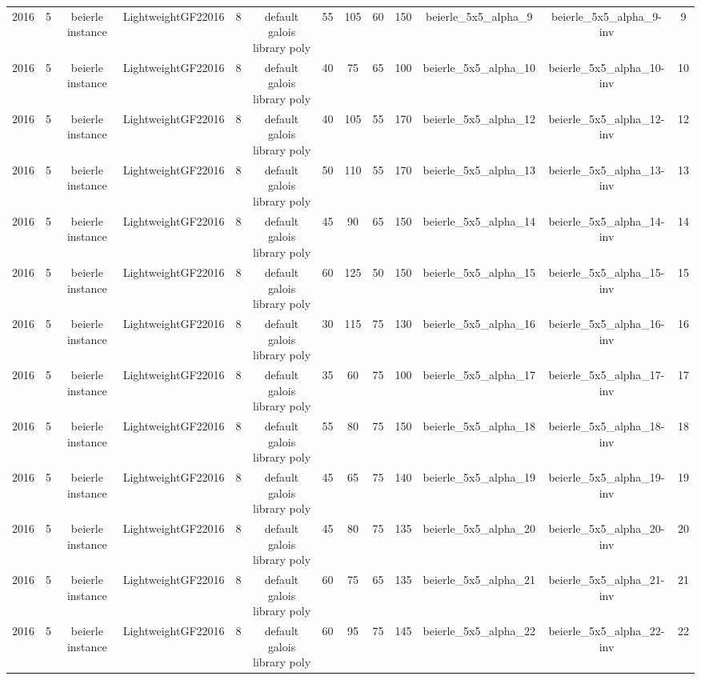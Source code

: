 \begin{tabular}{c c c c c c c c c c c c c}
2016 & 5 & beierle instance & LightweightGF22016 & 8 & default galois library poly & 55 & 105 & 60 & 150 & beierle_5x5_alpha_9 & beierle_5x5_alpha_9-inv & 9 \\
2016 & 5 & beierle instance & LightweightGF22016 & 8 & default galois library poly & 40 & 75 & 65 & 100 & beierle_5x5_alpha_10 & beierle_5x5_alpha_10-inv & 10 \\
2016 & 5 & beierle instance & LightweightGF22016 & 8 & default galois library poly & 40 & 105 & 55 & 170 & beierle_5x5_alpha_12 & beierle_5x5_alpha_12-inv & 12 \\
2016 & 5 & beierle instance & LightweightGF22016 & 8 & default galois library poly & 50 & 110 & 55 & 170 & beierle_5x5_alpha_13 & beierle_5x5_alpha_13-inv & 13 \\
2016 & 5 & beierle instance & LightweightGF22016 & 8 & default galois library poly & 45 & 90 & 65 & 150 & beierle_5x5_alpha_14 & beierle_5x5_alpha_14-inv & 14 \\
2016 & 5 & beierle instance & LightweightGF22016 & 8 & default galois library poly & 60 & 125 & 50 & 150 & beierle_5x5_alpha_15 & beierle_5x5_alpha_15-inv & 15 \\
2016 & 5 & beierle instance & LightweightGF22016 & 8 & default galois library poly & 30 & 115 & 75 & 130 & beierle_5x5_alpha_16 & beierle_5x5_alpha_16-inv & 16 \\
2016 & 5 & beierle instance & LightweightGF22016 & 8 & default galois library poly & 35 & 60 & 75 & 100 & beierle_5x5_alpha_17 & beierle_5x5_alpha_17-inv & 17 \\
2016 & 5 & beierle instance & LightweightGF22016 & 8 & default galois library poly & 55 & 80 & 75 & 150 & beierle_5x5_alpha_18 & beierle_5x5_alpha_18-inv & 18 \\
2016 & 5 & beierle instance & LightweightGF22016 & 8 & default galois library poly & 45 & 65 & 75 & 140 & beierle_5x5_alpha_19 & beierle_5x5_alpha_19-inv & 19 \\
2016 & 5 & beierle instance & LightweightGF22016 & 8 & default galois library poly & 45 & 80 & 75 & 135 & beierle_5x5_alpha_20 & beierle_5x5_alpha_20-inv & 20 \\
2016 & 5 & beierle instance & LightweightGF22016 & 8 & default galois library poly & 60 & 75 & 65 & 135 & beierle_5x5_alpha_21 & beierle_5x5_alpha_21-inv & 21 \\
2016 & 5 & beierle instance & LightweightGF22016 & 8 & default galois library poly & 60 & 95 & 75 & 145 & beierle_5x5_alpha_22 & beierle_5x5_alpha_22-inv & 22 \\

\end{tabular}
